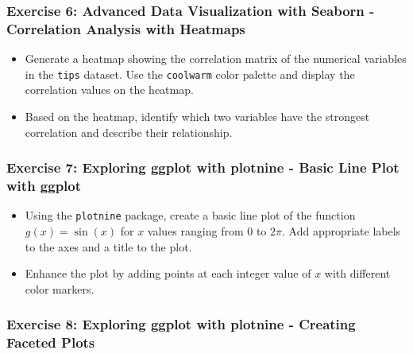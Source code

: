 \documentclass[
  letterpaper,
  DIV=11,
  numbers=noendperiod]{scrreprt}
\begin{document}
\hypertarget{exercise-6-advanced-data-visualization-with-seaborn---correlation-analysis-with-heatmaps}{%
\subsubsection{Exercise 6: Advanced Data Visualization with Seaborn -
Correlation Analysis with
Heatmaps}\label{exercise-6-advanced-data-visualization-with-seaborn---correlation-analysis-with-heatmaps}}

\begin{itemize}
\item
  Generate a heatmap showing the correlation matrix of the numerical
  variables in the \texttt{tips} dataset. Use the \texttt{coolwarm}
  color palette and display the correlation values on the heatmap.
\item
  Based on the heatmap, identify which two variables have the strongest
  correlation and describe their relationship.
\end{itemize}

\hypertarget{exercise-7-exploring-ggplot-with-plotnine---basic-line-plot-with-ggplot}{%
\subsubsection{Exercise 7: Exploring ggplot with plotnine - Basic Line
Plot with
ggplot}\label{exercise-7-exploring-ggplot-with-plotnine---basic-line-plot-with-ggplot}}

\begin{itemize}
\item
  Using the \texttt{plotnine} package, create a basic line plot of the
  function \(g(x) = \sin(x)\) for \(x\) values ranging from 0 to
  \(2\pi\). Add appropriate labels to the axes and a title to the plot.
\item
  Enhance the plot by adding points at each integer value of \(x\) with
  different color markers.
\end{itemize}

\hypertarget{exercise-8-exploring-ggplot-with-plotnine---creating-faceted-plots}{%
\subsubsection{Exercise 8: Exploring ggplot with plotnine - Creating
Faceted
Plots}\label{exercise-8-exploring-ggplot-with-plotnine---creating-faceted-plots}}
\end{document}
